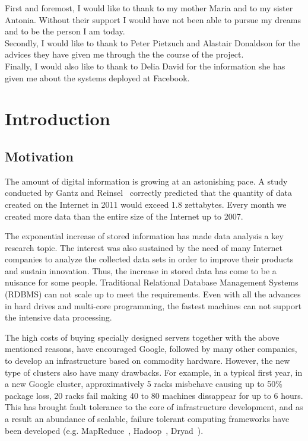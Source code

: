 \documentclass[11pt,a4paper,twoside]{report}
\begin{document}
\vspace{1.5cm}
\noindent
First and foremost, I would like to thank to my mother Maria and to my sister Antonia. Without their support I would have not been able to pursue my dreams and to be the person I am today.\\

\noindent
Secondly, I would like to thank to Peter Pietzuch and Alastair Donaldson for the advices they have given me through the the course of the project.\\

\noindent
Finally, I would also like to thank to Delia David for the information she has given me about the systems deployed at Facebook.

\newpage
\thispagestyle{empty}
\mbox{}
\newpage
\tableofcontents
\newpage

\chapter{Introduction}
\section{Motivation}
The amount of digital information is growing at an astonishing pace. A study conducted by Gantz and Reinsel~\cite{IDC} correctly predicted that the quantity of data created on the Internet in 2011 would exceed 1.8 zettabytes. Every month we created more data than the entire size of the Internet up to 2007.


The exponential increase of stored information has made data analysis a key research topic. The interest was also sustained by the need of many Internet companies to analyze the collected data sets in order to improve their products and sustain innovation. Thus, the increase in stored data has come to be a nuisance for some people. Traditional Relational Database Management Systems (RDBMS) can not scale up to meet the requirements. Even with all the advances in hard drives and multi-core programming, the fastest machines can not support the intensive data processing.


The high costs of buying specially designed servers together with the above mentioned reasons, have encouraged Google, followed by many other companies, to develop an infrastructure based on commodity hardware. However, the new type of clusters also have many drawbacks. For example, in a typical first year, in a new Google cluster, approximatively 5 racks misbehave causing up to 50\% package loss, 20 racks fail making 40 to 80 machines dissappear for up to 6 hours. This has brought fault tolerance to the core of infrastructure development, and as a result an abundance of scalable, failure tolerant computing frameworks have been developed (e.g. MapReduce~\cite{MapReduce}, Hadoop~\cite{Hadoop}, Dryad~\cite{Dryad,DryadLinq}).
\end{document}
